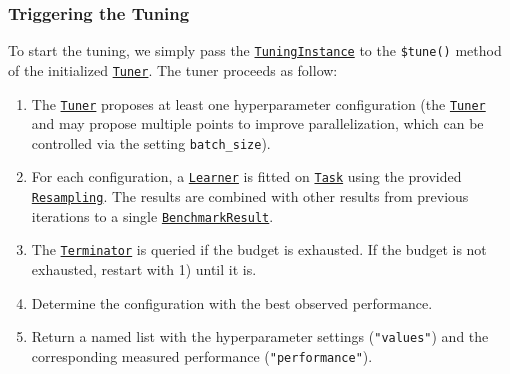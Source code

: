 \documentclass[]{article}
\newenvironment{Shaded}{\begin{snugshade}}{\end{snugshade}}
\newcommand{\KeywordTok}[1]{\textcolor[rgb]{0.13,0.29,0.53}{\textbf{#1}}}
\newcommand{\NormalTok}[1]{#1}
\newcommand{\OperatorTok}[1]{\textcolor[rgb]{0.81,0.36,0.00}{\textbf{#1}}}
\newcommand{\StringTok}[1]{\textcolor[rgb]{0.31,0.60,0.02}{#1}}
\providecommand{\tightlist}{%
  \setlength{\itemsep}{0pt}\setlength{\parskip}{0pt}}
\renewenvironment{Shaded} {\begin{snugshade}\small} {\end{snugshade}}
\begin{document}
\hypertarget{tuning-triggering}{%
\subsubsection{Triggering the Tuning}\label{tuning-triggering}}

To start the tuning, we simply pass the \href{https://mlr3tuning.mlr-org.com/reference/TuningInstance.html}{\texttt{TuningInstance}} to the \texttt{\$tune()} method of the initialized \href{https://mlr3tuning.mlr-org.com/reference/Tuner.html}{\texttt{Tuner}}.
The tuner proceeds as follow:

\begin{enumerate}
\def\labelenumi{\arabic{enumi}.}
\tightlist
\item
  The \href{https://mlr3tuning.mlr-org.com/reference/Tuner.html}{\texttt{Tuner}} proposes at least one hyperparameter configuration (the \href{https://mlr3tuning.mlr-org.com/reference/Tuner.html}{\texttt{Tuner}} and may propose multiple points to improve parallelization, which can be controlled via the setting \texttt{batch\_size}).
\item
  For each configuration, a \href{https://mlr3.mlr-org.com/reference/Learner.html}{\texttt{Learner}} is fitted on \href{https://mlr3.mlr-org.com/reference/Task.html}{\texttt{Task}} using the provided \href{https://mlr3.mlr-org.com/reference/Resampling.html}{\texttt{Resampling}}.
  The results are combined with other results from previous iterations to a single \href{https://mlr3.mlr-org.com/reference/BenchmarkResult.html}{\texttt{BenchmarkResult}}.
\item
  The \href{https://mlr3tuning.mlr-org.com/reference/Terminator.html}{\texttt{Terminator}} is queried if the budget is exhausted.
  If the budget is not exhausted, restart with 1) until it is.
\item
  Determine the configuration with the best observed performance.
\item
  Return a named list with the hyperparameter settings (\texttt{"values"}) and the corresponding measured performance (\texttt{"performance"}).
\end{enumerate}

\begin{Shaded}
\end{Shaded}
\end{document}
